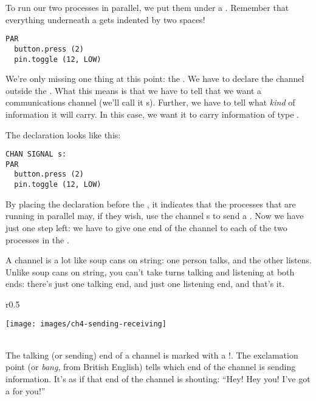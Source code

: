 \newpage

To run our two processes in parallel, we put them under a \PAR. Remember that everything underneath a \PAR gets indented by two spaces!

\vspace{3mm}
\begin{lstlisting}
PAR
  button.press (2)
  pin.toggle (12, LOW)
\end{lstlisting}

We're only missing one thing at this point: the \CHANnel. We have to {\strong declare} the channel outside the \PAR. What this means is that we have to tell \occam that we want a communications channel (we'll call it {\code s}). Further, we have to tell \occam what {\em kind} of information it will carry. In this case, we want it to carry information of type \SIGNALT. 

The declaration looks like this:

\vspace{3mm}
\begin{lstlisting}
CHAN SIGNAL s:
PAR
  button.press (2)
  pin.toggle (12, LOW)
\end{lstlisting}

By placing the declaration before the \PAR, it indicates that the processes that are running in parallel may, if they wish, use the channel {\code s} to send a \SIGNALV. Now we have just one step left: we have to give one end of the channel to each of the two processes in the \PAR.

\newpage

A channel is a lot like soup cans on string: one person talks, and the other listens. Unlike soup cans on string, you can't take turns talking and listening at both ends: there's just one talking end, and just one listening end, and that's it.

\begin{wrapfigure}{r}{0.5\linewidth}
	  \begin{center}
    	\texttt{[image: images/ch4-sending-receiving]}
  \end{center}
\end{wrapfigure}

\ \\

\vspace{3mm}
The talking (or {\strong sending}) end of a channel is marked with a {\code !}. The exclamation point (or {\em bang}, from British English) tells \occam which end of the channel is sending information. It's as if that end of the channel is shouting: ``Hey! Hey you! I've got a \SIGNALV for you!''

